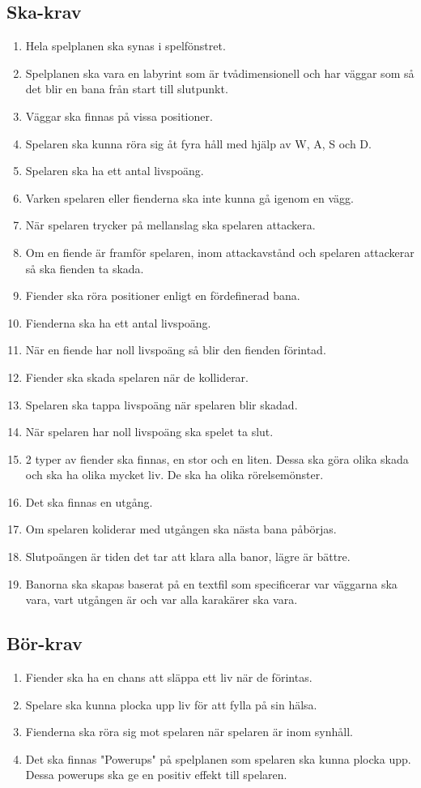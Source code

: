 \documentclass{TDP005mall}
\begin{document}
\subsection{Ska-krav}
\begin{enumerate}
  \item Hela spelplanen ska synas i spelfönstret.
  \item Spelplanen ska vara en labyrint som är tvådimensionell och har väggar som så det blir en bana från start till slutpunkt.
  \item Väggar ska finnas på vissa positioner.
  \item Spelaren ska kunna röra sig åt fyra håll med hjälp av W, A, S och D.
  \item Spelaren ska ha ett antal livspoäng.
  \item Varken spelaren eller fienderna ska inte kunna gå igenom en vägg.
  \item När spelaren trycker på mellanslag ska spelaren attackera.
  \item Om en fiende är framför spelaren, inom attackavstånd och spelaren attackerar så ska fienden ta skada.
  \item Fiender ska röra positioner enligt en fördefinerad bana.
  \item Fienderna ska ha ett antal livspoäng.
  \item När en fiende har noll livspoäng så blir den fienden förintad.
  \item Fiender ska skada spelaren när de kolliderar.
  \item Spelaren ska tappa livspoäng när spelaren blir skadad.
  \item När spelaren har noll livspoäng ska spelet ta slut.
  \item 2 typer av fiender ska finnas, en stor och en liten. Dessa ska göra olika skada och ska ha olika mycket liv. De ska ha olika rörelsemönster.
  \item Det ska finnas en utgång.
  \item Om spelaren koliderar med utgången ska nästa bana påbörjas.
  \item Slutpoängen är tiden det tar att klara alla banor, lägre är bättre.
  \item Banorna ska skapas baserat på en textfil som specificerar var väggarna ska vara, vart utgången är och var alla karakärer ska vara.
\end{enumerate}

\subsection{Bör-krav}
\begin{enumerate}
  \item Fiender ska ha en chans att släppa ett liv när de förintas.
  \item Spelare ska kunna plocka upp liv för att fylla på sin hälsa.
  \item Fienderna ska röra sig mot spelaren när spelaren är inom synhåll.
  \item Det ska finnas "Powerups" på spelplanen som spelaren ska kunna plocka upp. Dessa powerups ska ge en positiv effekt till spelaren.
\end{enumerate}
\end{document}
